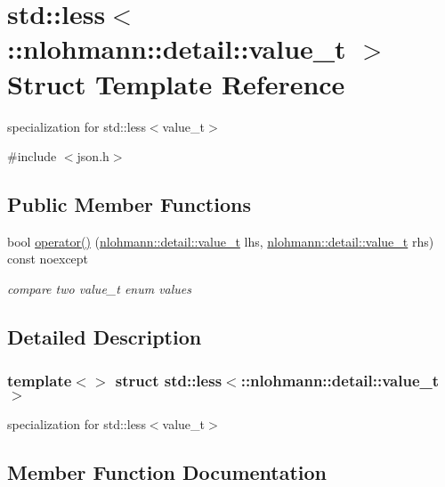 \hypertarget{structstd_1_1less_3_1_1nlohmann_1_1detail_1_1value__t_01_4}{}\section{std\+:\+:less$<$\+:\+:nlohmann\+:\+:detail\+:\+:value\+\_\+t $>$ Struct Template Reference}
\label{structstd_1_1less_3_1_1nlohmann_1_1detail_1_1value__t_01_4}


specialization for std\+::less$<$value\+\_\+t$>$  




{\ttfamily \#include $<$json.\+h$>$}

\subsection*{Public Member Functions}
\begin{DoxyCompactItemize}
\item 
bool \hyperlink{structstd_1_1less_3_1_1nlohmann_1_1detail_1_1value__t_01_4_a10d3fea50edf7b15ead8f4ceeb006000}{operator()} (\hyperlink{namespacenlohmann_1_1detail_a90aa5ef615aa8305e9ea20d8a947980f}{nlohmann\+::detail\+::value\+\_\+t} lhs, \hyperlink{namespacenlohmann_1_1detail_a90aa5ef615aa8305e9ea20d8a947980f}{nlohmann\+::detail\+::value\+\_\+t} rhs) const noexcept
\begin{DoxyCompactList}\small\item\em compare two value\+\_\+t enum values \end{DoxyCompactList}\end{DoxyCompactItemize}


\subsection{Detailed Description}
\subsubsection*{template$<$$>$\newline
struct std\+::less$<$\+::nlohmann\+::detail\+::value\+\_\+t $>$}

specialization for std\+::less$<$value\+\_\+t$>$ 

\subsection{Member Function Documentation}
\mbox{\label{structstd_1_1less_3_1_1nlohmann_1_1detail_1_1value__t_01_4_a10d3fea50edf7b15ead8f4ceeb006000}} 
